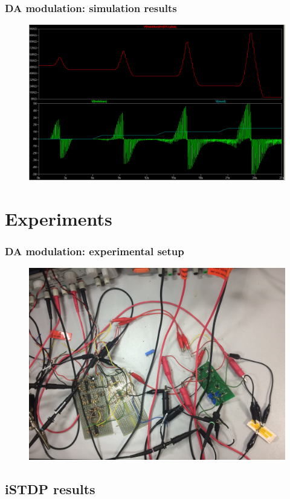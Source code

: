 \documentclass[12pt, aspectratio=169]{beamer}
\begin{document}
\begin{frame}
\frametitle{DA modulation: simulation results}
\begin{figure}
\includegraphics[width=0.8\linewidth]{da_modulation}
\end{figure}
\end{frame}

\section{Experiments}

\begin{frame}
  \frametitle{DA modulation: experimental setup}
\begin{figure}
\includegraphics[width=0.65\linewidth]{mscs_experimental_setup}
\end{figure}
\end{frame}


\subsection{iSTDP results}
\end{document}

